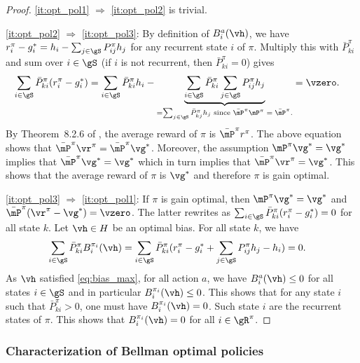 \begin{proof}
    \ref{it:opt_pol1} $\Rightarrow$ \ref{it:opt_pol2} is trivial.

    \ref{it:opt_pol2} $\Rightarrow$ \ref{it:opt_pol3}: By definition of $B_i^a(\vh)$, we have $r^{\pi}_i-g^*_i = h_i-\sum_{j\in\gS} P^{\pi}_{ij}h_j$ for any recurrent state $i$ of $\pi$.  Multiply this with $\bar{P}^\pi_{ki}$ and sum over $i\in\gS$ (if $i$ is not recurrent, then $\bar{P}^\pi_{ki}=0$) gives
    \begin{align*}
        \sum_{i\in\gS} \bar{P}^\pi_{ki}(r^{\pi}_i-g^*_i) = \sum_{i\in\gS} \bar{P}^\pi_{ki}h_i - \underbrace{\sum_{i\in\gS} \bar{P}^\pi_{ki}\sum_{j\in\gS} P^{\pi}_{ij}h_j}_{=\sum_{j\in\gS} \bar{P}^\pi_{kj}h_j \text{ since $\bar{\mP}^\pi\mP^\pi=\bar{\mP}^\pi$.}}
        &= \vzero.
    \end{align*}
    By Theorem~8.2.6 of \cite{puterman2014markov}, the average reward of $\pi$ is $\bar{\mP}^\pi r^\pi$. The above equation shows that $\bar{\mP}^\pi\vr^\pi = \bar{\mP}^\pi\vg^*$. Moreover, the assumption  $\mP^\pi\vg^*=\vg^*$ implies that $\bar{\mP}^\pi\vg^*=\vg^*$ which in turn implies that $\bar{\mP}^\pi\vr^\pi=\vg^*$. This shows that the average reward of $\pi$ is $\vg^*$ and therefore $\pi$ is gain optimal.

    \ref{it:opt_pol3} $\Rightarrow$ \ref{it:opt_pol1}: If $\pi$ is gain optimal, then $\mP^\pi \vg^*=\vg^*$ and $\bar{\mP}^\pi(\vr^\pi-\vg^*)=\vzero$. The latter rewrites as $\sum_{i\in\gS}\bar{P}^\pi_{ki}(r^{\pi}_i-g^*_i) =0$ for all state $k$. Let $\vh\in H$ be an optimal bias.  For all state $k$, we have    
    \begin{align}
        \label{eq:apx_proof_H}
        \sum_{i\in\gS}\bar{P}^\pi_{ki}B^{\pi_i}_i(\vh) = \sum_{i\in\gS}\bar{P}^\pi_{ki}(r^{\pi}_i-g^*_i +\sum_{j\in\gS}P^{\pi}_{ij}h_j -h_i) &=0.
    \end{align}
    As $\vh$ satisfied \eqref{eq:bias_max}, for all action $a$, we have $B^{a}_i(\vh) \le0$ for all states $i\in\gS$ and in particular $B^{\pi_i}_i(\vh) \le0$. This shows that for any state $i$ such that $\bar{P}^\pi_{ki}>0$, one must have $B^{\pi_i}_i(\vh) =0$. Such state $i$ are the recurrent states of $\pi$. This shows that $B^{\pi_i}_i(\vh) =0$ for all $i\in\gR^\pi$.
\end{proof}

\subsubsection{Characterization of Bellman optimal policies}

